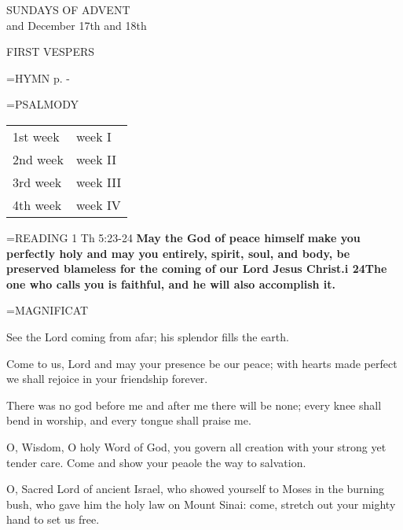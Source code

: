 \begin{center}\normalsize SUNDAYS OF ADVENT\\
\footnotesize and December 17th and 18th\\
\end{center}

\begin{flushleft}\normalsize FIRST VESPERS\\\end{flushleft}

\hangindent=\parindent \small{\uppercase{HYMN} p. \pageref{advent:firstHymn}-\pageref{advent:lastHymn}\\}

\hangindent=\parindent \small{PSALMODY}
\begin{center}
\begin{tabular}{ l l }
1st week &     week I\\
2nd week &     week II\\
3rd week &     week III\\
4th week &     week IV\\
\end{tabular}
\end{center}		

\hangindent=\parindent \small{\uppercase{READING}} 1 Th 5:23-24 \textbf{ May the God of peace himself make you perfectly holy and may you entirely, spirit, soul, and body, be preserved blameless for the coming of our Lord Jesus Christ.i 24The one who calls you is faithful, and he will also accomplish it.\\}

\hangindent=\parindent \small MAGNIFICAT
\begin{description}[labelindent=\parindent, leftmargin=*]
\item [Week 1:]  See the Lord coming from afar; his splendor fills the earth.
\item [Week 2:]  Come to us, Lord and may your presence be our peace; with hearts made perfect we shall rejoice in your friendship forever.
\item [Week 3:]  There was no god before me and after me there will be none; every knee shall bend in worship, and every tongue shall praise me.
\item [(December 17th):]  O, Wisdom, O holy Word of God, you govern all creation with your strong yet tender care. Come and show your peaole the way to salvation.
\item [(December 18th):]  O, Sacred Lord of ancient Israel, who showed yourself to Moses in the burning bush, who gave him the holy law on Mount Sinai: come, stretch out your mighty hand to set us free.
\end{description}

